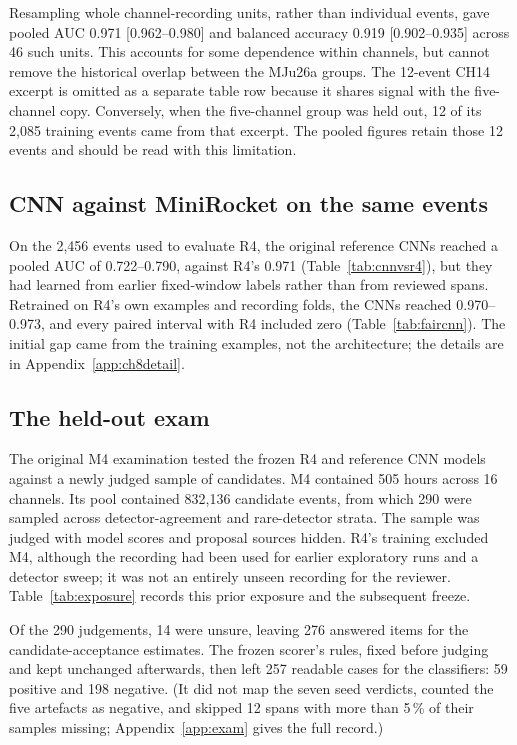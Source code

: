 Resampling whole channel-recording units, rather than individual events, gave pooled AUC 0.971 [0.962--0.980] and balanced accuracy 0.919 [0.902--0.935] across 46 such units. This accounts for some dependence within channels, but cannot remove the historical overlap between the MJu26a groups. The 12-event CH14 excerpt is omitted as a separate table row because it shares signal with the five-channel copy. Conversely, when the five-channel group was held out, 12 of its 2,085 training events came from that excerpt. The pooled figures retain those 12 events and should be read with this limitation.


\subsection{CNN against MiniRocket on the same events}

On the 2,456 events used to evaluate R4, the original reference CNNs reached a pooled AUC of 0.722--0.790, against R4's 0.971 (Table~\ref{tab:cnnvsr4}), but they had learned from earlier fixed-window labels rather than from reviewed spans. Retrained on R4's own examples and recording folds, the CNNs reached 0.970--0.973, and every paired interval with R4 included zero (Table~\ref{tab:faircnn}). The initial gap came from the training examples, not the architecture; the details are in Appendix~\ref{app:ch8detail}.

\subsection{The held-out exam}
\label{sec:classifierexam}

The original M4 examination tested the frozen R4 and reference CNN models against a newly judged sample of candidates. M4 contained 505 hours across 16 channels. Its pool contained 832,136 candidate events, from which 290 were sampled across detector-agreement and rare-detector strata. The sample was judged with model scores and proposal sources hidden. R4's training excluded M4, although the recording had been used for earlier exploratory runs and a detector sweep; it was not an entirely unseen recording for the reviewer. Table~\ref{tab:exposure} records this prior exposure and the subsequent freeze.

Of the 290 judgements, 14 were unsure, leaving 276 answered items for the candidate-acceptance estimates. The frozen scorer's rules, fixed before judging and kept unchanged afterwards, then left 257 readable cases for the classifiers: 59 positive and 198 negative. (It did not map the seven seed verdicts, counted the five artefacts as negative, and skipped 12 spans with more than 5\,\% of their samples missing; Appendix~\ref{app:exam} gives the full record.)

